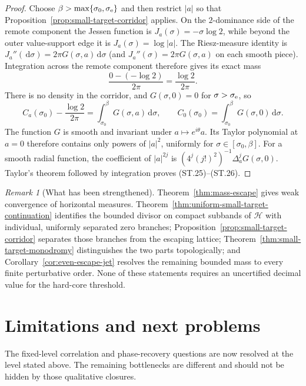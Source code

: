 \documentclass[11pt]{article}
\theoremstyle{definition}
\theoremstyle{remark}
\newtheorem{remark}[theorem]{Remark}
\newcommand{\dd}{\,\mathrm d}
\begin{document}
\begin{proof}
Choose $\beta>\max\{\sigma_0,\sigma_{\rm e}\}$ and then restrict $|a|$ so that
Proposition~\ref{prop:small-target-corridor} applies.  On the $2$-dominance side of the
remote component the Jessen function is $J_a(\sigma)=-\sigma\log2$, while beyond the
outer value-support edge it is $J_a(\sigma)=\log|a|$.  The Riesz-measure identity is
$J_a''(\dd\sigma)=2\pi G(\sigma,a)\dd\sigma$ (and
$J_a''(\sigma)=2\pi G(\sigma,a)$ on each smooth piece).  Integration across
the remote component therefore gives its
exact mass
\[
 \frac{0-(-\log2)}{2\pi}=\frac{\log2}{2\pi}.
 \tag{ST.27}
\]
There is no density in the corridor, and $G(\sigma,0)=0$ for
$\sigma>\sigma_{\rm e}$, so
\[
 C_a(\sigma_0)-\frac{\log2}{2\pi}
 =\int_{\sigma_0}^{\beta}G(\sigma,a)\dd\sigma,
 \qquad
 C_0(\sigma_0)=\int_{\sigma_0}^{\beta}G(\sigma,0)\dd\sigma.
\]
The function $G$ is smooth and invariant under $a\mapsto e^{i\theta}a$.  Its Taylor
polynomial at $a=0$ therefore contains only powers of $|a|^2$, uniformly for
$\sigma\in[\sigma_0,\beta]$.  For a smooth radial function, the coefficient of
$|a|^{2j}$ is $(4^j(j!)^2)^{-1}\Delta_a^jG(\sigma,0)$.  Taylor's theorem followed by
integration proves (ST.25)--(ST.26).
\end{proof}

\begin{remark}[What has been strengthened]
Theorem~\ref{thm:mass-escape} gives weak convergence of horizontal measures.
Theorem~\ref{thm:uniform-small-target-continuation} identifies the bounded divisor on
compact subbands of $\mathcal H$ with individual, uniformly separated zero branches;
Proposition~\ref{prop:small-target-corridor}
separates those branches from the escaping lattice; Theorem~\ref{thm:small-target-monodromy}
distinguishes the two parts topologically; and Corollary~\ref{cor:even-escape-jet}
resolves the remaining bounded mass to every finite perturbative order.  None of these
statements requires an uncertified decimal value for the hard-core threshold.
\end{remark}

\section{Limitations and next problems}
\label{sec:limits}

The fixed-level correlation and phase-recovery questions are now resolved at
the level stated above.  The remaining bottlenecks are different and should not
be hidden by those qualitative closures.
\end{document}
